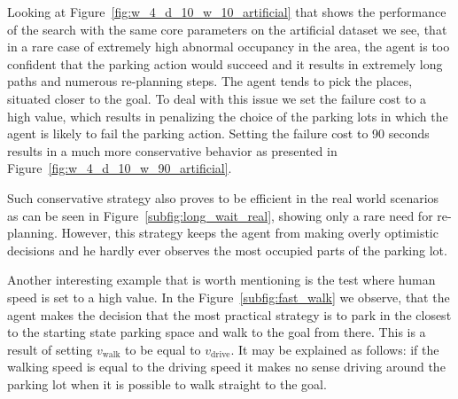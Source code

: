 Looking at Figure~\ref{fig:w_4_d_10_w_10_artificial} that shows the
performance of the search with the same core parameters on the artificial
dataset we see, that in a rare case of extremely high abnormal occupancy in
the area, the agent is too confident that the parking action would succeed and
it results in extremely long paths and numerous re-planning steps. The agent
tends to pick the places, situated closer to the goal. To deal with this issue
we set the failure cost to a high value, which results in penalizing the
choice of the parking lots in which the agent is likely to fail the parking
action. Setting the failure cost to 90 seconds results in a much more
conservative behavior as presented in
Figure~\ref{fig:w_4_d_10_w_90_artificial}.

Such conservative strategy also proves to be efficient in the real world
scenarios as can be seen in Figure~\ref{subfig:long_wait_real}, showing only a
rare need for re-planning. However, this strategy keeps the agent from making
overly optimistic decisions and he hardly ever observes the most occupied
parts of the parking lot.

Another interesting example that is worth mentioning is the test where human
speed is set to a high value. In the Figure~\ref{subfig:fast_walk} we observe,
that the agent makes the decision that the most practical strategy is to park
in the closest to the starting state parking space and walk to the goal from
there. This is a result of setting $v_{\mathrm{walk}}$ to be equal to $v_{\mathrm{drive}}$. It
may be explained as follows: if the walking speed is equal to the driving
speed it makes no sense driving around the parking lot when it is possible to
walk straight to the goal.


